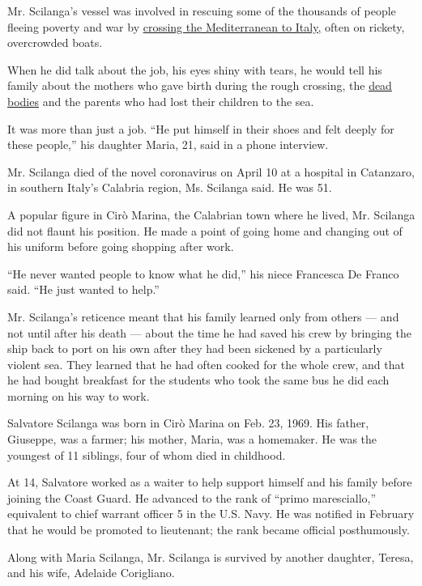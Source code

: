 Mr. Scilanga's vessel was involved in rescuing some of the thousands of
people fleeing poverty and war by
\href{https://www.nytimes.com/2016/12/21/world/europe/italy-overwhelmed-migrant-crisis.html}{crossing
the Mediterranean to Italy,} often on rickety, overcrowded boats.

When he did talk about the job, his eyes shiny with tears, he would tell
his family about the mothers who gave birth during the rough crossing,
the
\href{https://www.nytimes.com/2015/04/21/world/europe/european-union-immigration-migrant-ship-capsizes.html}{dead
bodies} and the parents who had lost their children to the sea.

It was more than just a job. ``He put himself in their shoes and felt
deeply for these people,'' his daughter Maria, 21, said in a phone
interview.

Mr. Scilanga died of the novel coronavirus on April 10 at a hospital in
Catanzaro, in southern Italy's Calabria region, Ms. Scilanga said. He
was 51.

A popular figure in Cirò Marina, the Calabrian town where he lived, Mr.
Scilanga did not flaunt his position. He made a point of going home and
changing out of his uniform before going shopping after work.

``He never wanted people to know what he did,'' his niece Francesca De
Franco said. ``He just wanted to help.''

Mr. Scilanga's reticence meant that his family learned only from others
--- and not until after his death --- about the time he had saved his
crew by bringing the ship back to port on his own after they had been
sickened by a particularly violent sea. They learned that he had often
cooked for the whole crew, and that he had bought breakfast for the
students who took the same bus he did each morning on his way to work.

Salvatore Scilanga was born in Cirò Marina on Feb. 23, 1969. His father,
Giuseppe, was a farmer; his mother, Maria, was a homemaker. He was the
youngest of 11 siblings, four of whom died in childhood.

At 14, Salvatore worked as a waiter to help support himself and his
family before joining the Coast Guard. He advanced to the rank of
``primo maresciallo,'' equivalent to chief warrant officer 5 in the U.S.
Navy. He was notified in February that he would be promoted to
lieutenant; the rank became official posthumously.

Along with Maria Scilanga, Mr. Scilanga is survived by another daughter,
Teresa, and his wife, Adelaide Corigliano.

